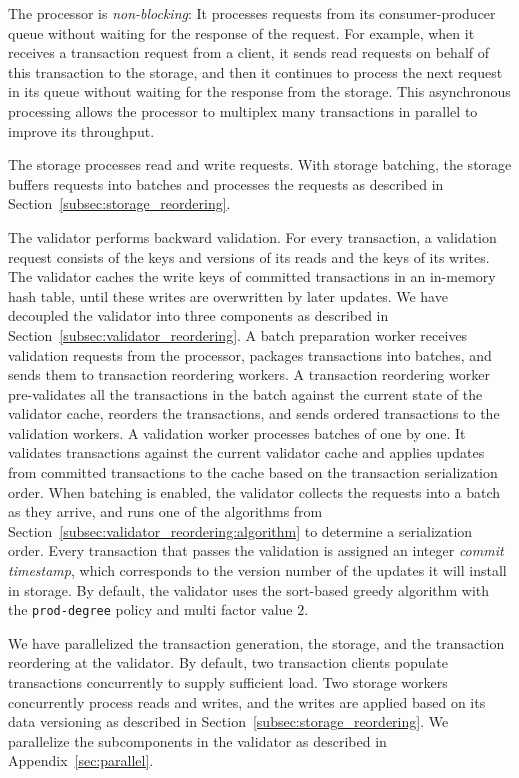 The processor is \emph{non-blocking}: It processes requests from its consumer-producer queue without waiting for the response of the request. For example, when it receives a transaction request from a client, it sends read requests on behalf of this transaction to the storage, and then it continues to process the next request in its queue without waiting for the response from the storage. This asynchronous processing allows the processor to multiplex many transactions in parallel to improve its throughput.

The storage processes read and write requests. With storage batching, the storage buffers requests into batches and processes the requests as described in Section~\ref{subsec:storage_reordering}.

The validator performs backward validation. For every transaction, a validation request consists of the keys and versions of its reads and the keys of its writes. The validator caches the write keys of committed transactions in an in-memory hash table, until these writes are overwritten by later updates.
We have decoupled the validator into three components as described in Section~\ref{subsec:validator_reordering}. A batch preparation worker receives validation requests from the processor, packages transactions into batches, and sends them to transaction reordering workers. A transaction reordering worker pre-validates all the transactions in the batch against the current state of the validator cache, reorders the transactions, and sends ordered transactions to the validation workers. A validation worker processes batches of  one by one. It validates transactions against the current validator cache and applies updates from committed transactions to the cache based on the transaction serialization order.  When batching is enabled, the validator collects the requests into a batch as they arrive, and runs one of the algorithms from Section~\ref{subsec:validator_reordering:algorithm} to determine a serialization order. Every transaction that passes the validation is assigned an integer \emph{commit timestamp}, which corresponds to the version number of the updates it will install in storage. 
By default, the validator uses the sort-based greedy algorithm with the \texttt{prod-degree} policy and multi factor  value $2$.


We have parallelized the transaction generation, the storage, and the transaction reordering at the validator. By default, two transaction clients populate transactions concurrently to supply sufficient load. Two storage workers concurrently process reads and writes, 
and the writes are applied based on its data versioning as described in Section~\ref{subsec:storage_reordering}. 
We parallelize the subcomponents in the validator as described in Appendix~\ref{sec:parallel}.


